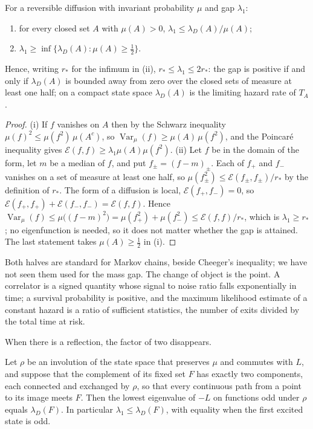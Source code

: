\begin{theorem}\label{thm:hitgap}
For a reversible diffusion with invariant probability $\mu$ and gap $\lambda_1$:
\begin{enumerate}
\item[(i)] for every closed set $A$ with $\mu(A)>0$, $\lambda_1\le\lambda_D(A)/\mu(A)$;
\item[(ii)] $\lambda_1\ge\inf\{\lambda_D(A):\mu(A)\ge\frac12\}$.
\end{enumerate}
Hence, writing $r_*$ for the infimum in (ii), $r_*\le\lambda_1\le2r_*$: the gap is positive if and only if $\lambda_D(A)$ is bounded away from zero over the closed sets of measure at least one half; on a compact state space $\lambda_D(A)$ is the limiting hazard rate of $T_A$.
\end{theorem}

\begin{proof}
(i) If $f$ vanishes on $A$ then by the Schwarz inequality $\mu(f)^2\le\mu(f^2)\,\mu(A^c)$, so $\operatorname{Var}_\mu(f)\ge\mu(A)\,\mu(f^2)$, and the Poincar\'e inequality gives $\mathcal E(f,f)\ge\lambda_1\mu(A)\mu(f^2)$. (ii) Let $f$ be in the domain of the form, let $m$ be a median of $f$, and put $f_\pm=(f-m)_\pm$. Each of $f_+$ and $f_-$ vanishes on a set of measure at least one half, so $\mu(f_\pm^2)\le\mathcal E(f_\pm,f_\pm)/r_*$ by the definition of $r_*$. The form of a diffusion is local, $\mathcal E(f_+,f_-)=0$, so $\mathcal E(f_+,f_+)+\mathcal E(f_-,f_-)=\mathcal E(f,f)$. Hence $\operatorname{Var}_\mu(f)\le\mu\big((f-m)^2\big)=\mu(f_+^2)+\mu(f_-^2)\le\mathcal E(f,f)/r_*$, which is $\lambda_1\ge r_*$; no eigenfunction is needed, so it does not matter whether the gap is attained. The last statement takes $\mu(A)\ge\frac12$ in (i).
\end{proof}

Both halves are standard for Markov chains, beside Cheeger's inequality; we have not seen them used for the mass gap. The change of object is the point. A correlator is a signed quantity whose signal to noise ratio falls exponentially in time; a survival probability is positive, and the maximum likelihood estimate of a constant hazard is a ratio of sufficient statistics, the number of exits divided by the total time at risk.

When there is a reflection, the factor of two disappears.

\begin{proposition}[Reflection]\label{prop:hitreflect}
Let $\rho$ be an involution of the state space that preserves $\mu$ and commutes with $L$, and suppose that the complement of its fixed set $F$ has exactly two components, each connected and exchanged by $\rho$, so that every continuous path from a point to its image meets $F$. Then the lowest eigenvalue of $-L$ on functions odd under $\rho$ equals $\lambda_D(F)$. In particular $\lambda_1\le\lambda_D(F)$, with equality when the first excited state is odd.
\end{proposition}

